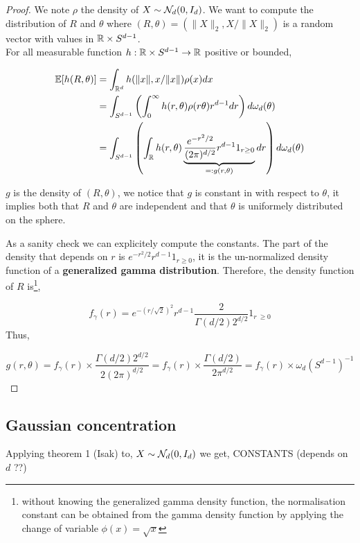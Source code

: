 \documentclass{article}
\begin{document}
\begin{proof}
  We note $\rho$ the density of $X \sim \mathcal{N}_d(0,I_d)$. We want to compute the
  distribution of $R$ and $\theta$ where $(R,\theta) = (\|X\|_2,X/\|X\|_2)$ is a random
  vector with values in $\mathbb{R} \times S^{d-1}$. \\ For all measurable function
  $h:\mathbb{R} \times S^{d-1} \to \mathbb{R}$ positive or bounded, 

\begin{equation}
\begin{aligned}
  \mathbb{E}[h(R,\theta)] &= \int_{\mathbb{R}^{d}} h(\|x\|,x/\|x\|)\rho(x) d x \\  &= \int_{S^{d-1}}\left(\int_{0}^{\infty} h(r,\theta) \rho(r\theta) r^{d-1} d r\right) d \omega_d(\theta) \\
  &= \int_{S^{d-1}}\left(\int_{\mathbb{R}} h(r,\theta) \underbrace{\frac{e^{-r^2/2}}{(2\pi)^{d/2}} r^{d-1}1_{r \geq 0}}_{=: g(r,\theta)} d r\right) d \omega_d(\theta)
\end{aligned}
\end{equation}

$g$ is the density of $(R,\theta)$, we notice that $g$ is constant in with
respect to $\theta$, it implies both that $R$ and $\theta$ are independent and
that $\theta$ is uniformely distributed on the sphere.

As a sanity check we can explicitely compute the constants. The part of
the density that depends on $r$ is $e^{-r^2/2} r^{d-1}1_{r \geq 0}$, it is the un-normalized
density function of a \textbf{generalized gamma distribution}. Therefore, the
density function of $R$ is\footnote{without knowing the generalized gamma density function, the
  normalisation constant can be obtained from the gamma density
  function by applying the change of variable $\phi(x) = \sqrt{x}$},

$$f_{\gamma}(r) = e^{-(r/\sqrt{2})^2} r^{d-1} \frac{2}{\Gamma(d/2)2^{d/2}}1_{r\
  \geq 0}$$
Thus,

$$ g(r,\theta) = f_{\gamma}(r) \times \frac{\Gamma(d/2)2^{d/2}}{2(2\pi)^{d/2}} = f_{\gamma}(r) \times \frac{\Gamma(d/2)}{2\pi^{d/2}} = f_{\gamma}(r) \times \omega_d(S^{d-1})^{-1}$$

\end{proof}

\subsection{Gaussian concentration}

Applying theorem 1 (Isak) to, $X \sim \mathcal{N}_d(0,I_d)$ we get, CONSTANTS (depends
on $d$ ??)
\end{document}

